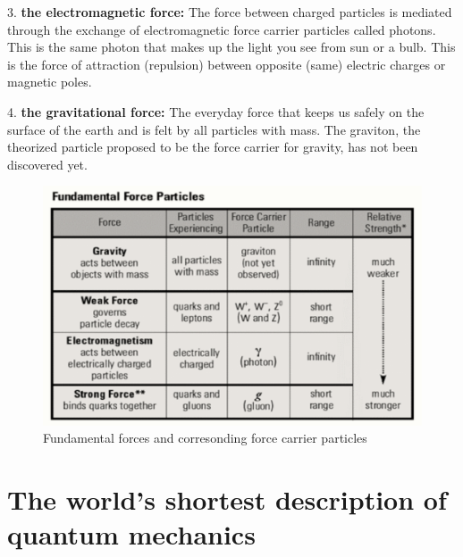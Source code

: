 3.	{\bf the electromagnetic force:}
The force between charged particles is mediated through the exchange of electromagnetic force carrier particles called photons.  This is the same photon that makes up the light you see from sun or a bulb. This is the force of attraction (repulsion) between opposite (same) electric charges or magnetic poles. 

4.	{\bf the gravitational force: }
The everyday force that keeps us safely on the surface of the earth and is felt by all particles with mass. The graviton, the theorized particle proposed to be the force carrier for gravity, 
has not been discovered yet. 


\begin{figure}[h]
\centering\includegraphics[scale=0.5]{./ElementaryParticles/Pictures/fig4.pdf}
\caption{Fundamental forces and corresonding force carrier particles}
\label{fig:fig4}
\end{figure}


\section{The world's shortest description of quantum mechanics}

